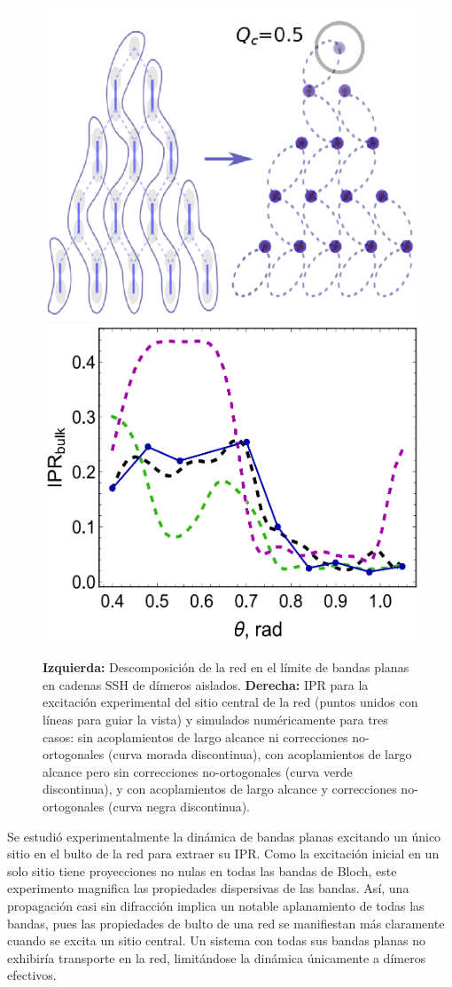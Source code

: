 \begin{figure}[H]
	\centering
	\includegraphics[width=0.5\linewidth]{media/cuasi-ssh.png}
	\includegraphics[width=0.45\linewidth]{media/ipr-bulk-exp.png}
	\caption[Descomposición de la red en cadenas cuasi-SSH]{  
		\textbf{Izquierda: }  
		Descomposición de la red en el límite de bandas planas en cadenas SSH de dímeros aislados. \textbf{Derecha: }  IPR para la excitación experimental del sitio central de la red (puntos unidos con líneas para guiar la vista) y simulados numéricamente para tres casos: sin acoplamientos de largo alcance ni correcciones no-ortogonales (curva morada discontinua), con acoplamientos de largo alcance pero sin correcciones no-ortogonales (curva verde discontinua), y con acoplamientos de largo alcance y correcciones no-ortogonales (curva negra discontinua).  \label{fig:cuasi-ssh}}
\end{figure} \vspace{-2ex}
Se estudió experimentalmente la dinámica de bandas planas excitando un único sitio en el bulto de la red para extraer su IPR. Como la excitación inicial en un solo sitio tiene proyecciones no nulas en todas las bandas de Bloch, este experimento magnifica las propiedades dispersivas de las bandas. Así, una propagación casi sin difracción implica un notable aplanamiento de todas las bandas, pues las propiedades de bulto de una red se manifiestan más claramente cuando se excita un sitio central. Un sistema con todas sus bandas planas no exhibiría transporte en la red, limitándose la dinámica únicamente a dímeros efectivos.

